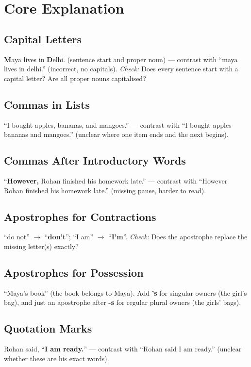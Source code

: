 \section{Core Explanation}

\subsection*{Capital Letters}
\textbf{M}aya lives in \textbf{D}elhi. (sentence start and proper noun) --- contrast with ``maya lives in delhi.'' (incorrect, no capitals). \textit{Check:} Does every sentence start with a capital letter? Are all proper nouns capitalised?

\subsection*{Commas in Lists}
``I bought apples, bananas, and mangoes.'' --- contrast with ``I bought apples bananas and mangoes.'' (unclear where one item ends and the next begins).

\subsection*{Commas After Introductory Words}
``\textbf{However,} Rohan finished his homework late.'' --- contrast with ``However Rohan finished his homework late.'' (missing pause, harder to read).

\subsection*{Apostrophes for Contractions}
``do not'' $\rightarrow$ ``\textbf{don't}''; ``I am'' $\rightarrow$ ``\textbf{I'm}''. \textit{Check:} Does the apostrophe replace the missing letter(s) exactly?

\subsection*{Apostrophes for Possession}
``Maya's book'' (the book belongs to Maya). Add \textbf{'s} for singular owners (the girl's bag), and just an apostrophe after \textbf{-s} for regular plural owners (the girls' bags).

\subsection*{Quotation Marks}
Rohan said, ``\textbf{I am ready.}'' --- contrast with ``Rohan said I am ready.'' (unclear whether these are his exact words).

